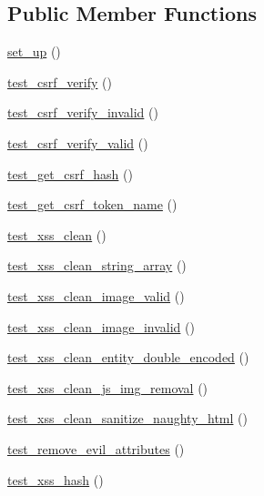\subsection*{Public Member Functions}
\begin{DoxyCompactItemize}
\item 
\hyperlink{class_security__test_a69829875c8d4b6ce94908445c4155741}{set\+\_\+up} ()
\item 
\hyperlink{class_security__test_a142254f2c96c6c9ce3a7381ff4317e63}{test\+\_\+csrf\+\_\+verify} ()
\item 
\hyperlink{class_security__test_a5c1098aaecbd831ed5c72c54b4b3e0b9}{test\+\_\+csrf\+\_\+verify\+\_\+invalid} ()
\item 
\hyperlink{class_security__test_a165230b68f3829801435a0cfb98cc6e4}{test\+\_\+csrf\+\_\+verify\+\_\+valid} ()
\item 
\hyperlink{class_security__test_a8eaa1b2b4c3631664172480e1335736d}{test\+\_\+get\+\_\+csrf\+\_\+hash} ()
\item 
\hyperlink{class_security__test_aa6161c7ee67776de2b1564a05ce5d3e6}{test\+\_\+get\+\_\+csrf\+\_\+token\+\_\+name} ()
\item 
\hyperlink{class_security__test_a0b11d7a4927affa03666d3d4accf569e}{test\+\_\+xss\+\_\+clean} ()
\item 
\hyperlink{class_security__test_af9caa37a5906f20cd08e2c3df6f9a333}{test\+\_\+xss\+\_\+clean\+\_\+string\+\_\+array} ()
\item 
\hyperlink{class_security__test_abdf8903147b403cb1d4102098ad90dfa}{test\+\_\+xss\+\_\+clean\+\_\+image\+\_\+valid} ()
\item 
\hyperlink{class_security__test_a04737d98779fd104b6a55c839be2ac1a}{test\+\_\+xss\+\_\+clean\+\_\+image\+\_\+invalid} ()
\item 
\hyperlink{class_security__test_a1c2b8241fb92a40d055eab3fc766c4e3}{test\+\_\+xss\+\_\+clean\+\_\+entity\+\_\+double\+\_\+encoded} ()
\item 
\hyperlink{class_security__test_affdc4dee3749b4d913368ca735fa9aa1}{test\+\_\+xss\+\_\+clean\+\_\+js\+\_\+img\+\_\+removal} ()
\item 
\hyperlink{class_security__test_a216c5fc4a46bea9904dffec3d1849161}{test\+\_\+xss\+\_\+clean\+\_\+sanitize\+\_\+naughty\+\_\+html} ()
\item 
\hyperlink{class_security__test_a27d7daf9e757a690e8f573eb48c076b5}{test\+\_\+remove\+\_\+evil\+\_\+attributes} ()
\item 
\hyperlink{class_security__test_ad633d99317f2b05d354a9db53f1765e8}{test\+\_\+xss\+\_\+hash} ()

\end{DoxyCompactItemize}
